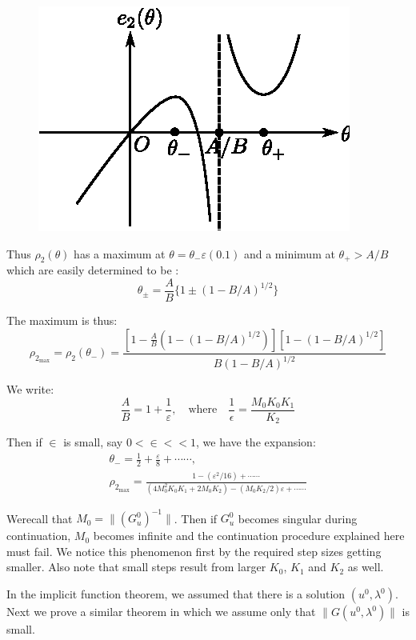 \begin{figure}[H]
\centering
\includegraphics{vol79-fig/fig79-14.eps}
\smallskip
\caption{}
\label{chap2-fig2.1}        
\end{figure}\pageoriginale

Thus $\rho_2 (\theta)$ has a maximum at $\theta = \theta_- \varepsilon
(0.1)$ and a minimum at $\theta_+ > A/B$ which are easily determined to
be : 
$$
\theta_\pm = \frac{A}{B}\{ 1 \pm(1- B/A)^{1/2}\} 
$$

The maximum is thus: 
$$
\rho_{2_{\max}} = \rho_2(\theta_-) = \frac{[1-
    \frac{A}{B}(1-(1-B/A)^{1/2})][1-(1-B/A)^{1/2}]}{B(1-B/A)^{1/2}} 
$$

We write:
$$
\frac{A}{B}= 1 + \frac{1}{\varepsilon},\quad\text{where}\quad
\frac{1}{\epsilon}= \frac{M_0 K_0 K_1}{K_2}  
$$

Then if $\in$ is small, say $0 < \in << 1$, we have the expansion:
\begin{gather*}
\theta_- = \frac{1}{2}+ \frac{\varepsilon}{8}+\cdots\cdots,
\tag{2.17a}\label{chap2-sec2.14-eq2.17a}\\
 \rho_{2_{\max}} = \frac{1-(\varepsilon^2 /16)+\cdots\cdots}{(4M^2_0
   K_0 K_1 + 2M_0 K_2) - (M_0 K_2/2)\varepsilon + \cdots\cdots} \tag{2.17b} 
\label{chap2-sec2.14-eq2.17b}        
\end{gather*}

We\pageoriginale recall that $M_0 = \| (G_u^0)^{-1}\|$. Then if
$G_u^0$ becomes singular during continuation, $M_0$ becomes infinite
and the  continuation procedure explained here must fail. We notice this
phenomenon first by the required step sizes getting smaller. Also note
that small steps result from larger $K_0$, $K_1$ and $ K_2$ as well.  

In the implicit function theorem, we assumed that there is a solution
$(u^0 , \lambda^0)$. Next we prove a similar theorem in which we
assume only that $\| G(u^0, \lambda^0)\|$ is small.  

